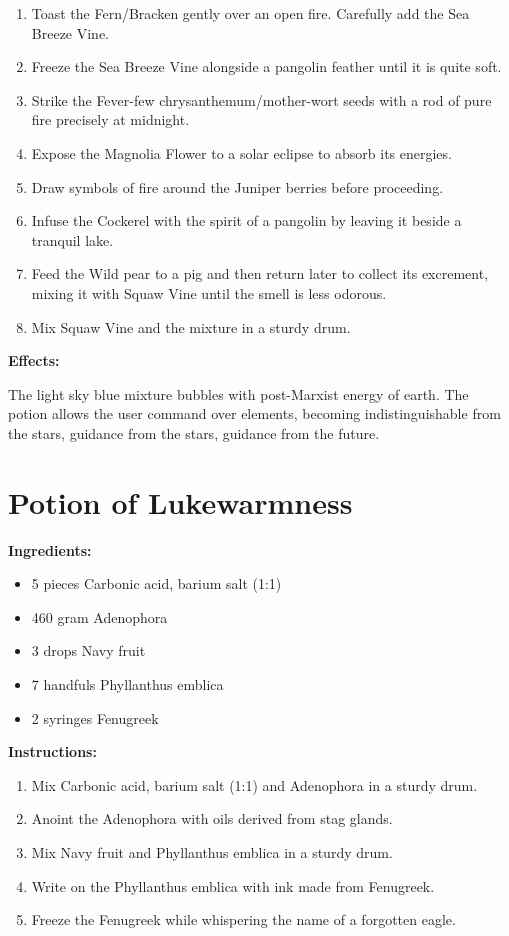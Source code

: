 \documentclass{article}
\begin{document}
\begin{enumerate}
  \item Toast the Fern/Bracken gently over an open fire. Carefully add the Sea Breeze Vine.
  \item Freeze the Sea Breeze Vine alongside a pangolin feather until it is quite soft.
  \item Strike the Fever-few chrysanthemum/mother-wort seeds with a rod of pure fire precisely at midnight.
  \item Expose the Magnolia Flower to a solar eclipse to absorb its energies.
  \item Draw symbols of fire around the Juniper berries before proceeding.
  \item Infuse the Cockerel with the spirit of a pangolin by leaving it beside a tranquil lake.
  \item Feed the Wild pear to a pig and then return later to collect its excrement, mixing it with Squaw Vine until the smell is less odorous.
  \item Mix Squaw Vine and the mixture in a sturdy drum.
\end{enumerate}

\textbf{Effects:}

The light sky blue mixture bubbles with post-Marxist energy of earth. The potion allows the user command over elements, becoming indistinguishable from the stars, guidance from the stars, guidance from the future.

\newpage
\section*{Potion of Lukewarmness}

\textbf{Ingredients:}

\begin{itemize}
  \item 5 pieces Carbonic acid, barium salt (1:1)
  \item 460 gram Adenophora
  \item 3 drops Navy fruit
  \item 7 handfuls Phyllanthus emblica
  \item 2 syringes Fenugreek
\end{itemize}

\textbf{Instructions:}

\begin{enumerate}
  \item Mix Carbonic acid, barium salt (1:1) and Adenophora in a sturdy drum.
  \item Anoint the Adenophora with oils derived from stag glands.
  \item Mix Navy fruit and Phyllanthus emblica in a sturdy drum.
  \item Write on the Phyllanthus emblica with ink made from Fenugreek.
  \item Freeze the Fenugreek while whispering the name of a forgotten eagle.
\end{enumerate}
\end{document}
